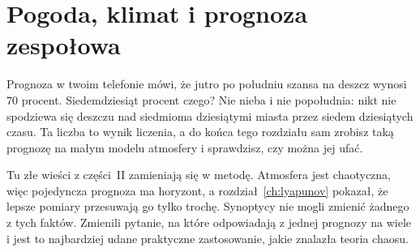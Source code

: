 
\chapter{Pogoda, klimat i prognoza zespołowa}
\label{ch:weather}

\noindent
Prognoza w twoim telefonie mówi, że jutro po południu szansa na deszcz
wynosi $70$ procent. Siedemdziesiąt procent czego? Nie nieba i nie
popołudnia: nikt nie spodziewa się deszczu nad siedmioma dziesiątymi miasta
przez siedem dziesiątych czasu. Ta liczba to wynik liczenia, a do końca tego
rozdziału sam zrobisz taką prognozę na małym modelu atmosfery i sprawdzisz,
czy można jej ufać.

Tu złe wieści z części~II zamieniają się w metodę. Atmosfera jest
chaotyczna, więc pojedyncza prognoza ma horyzont, a
rozdział~\ref{ch:lyapunov} pokazał, że lepsze pomiary przesuwają go tylko
trochę. Synoptycy nie mogli zmienić żadnego z tych faktów. Zmienili pytanie,
na które odpowiadają \dash{} z jednej prognozy na wiele \dash{} i jest to
najbardziej udane praktyczne zastosowanie, jakie znalazła teoria chaosu.

\begin{outcomes}
\end{outcomes}

